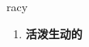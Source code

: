 
\begin{frame}
{\huge racy}
\begin{center}
\begin{enumerate}\Large
  \item \textbf{活泼生动的}
\end{enumerate}
\end{center}
\end{frame}
